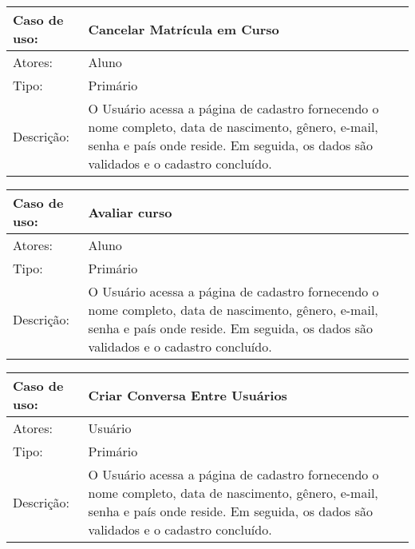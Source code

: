 \documentclass[12pt,a4paper,onecolumn,titlepage]{article}
\begin{document}
\begin{table}[h!]
\begin{center}
\begin{tabular}{p{2.5cm} p{9.5cm}}
Caso de uso: & \textbf{Cancelar Matrícula em Curso} \\ \hline
Atores: & Aluno \\ \hline
Tipo: & Primário \\ \hline
Descrição: & O Usuário acessa a página de cadastro fornecendo o nome completo, data de nascimento, gênero, e-mail, senha e país onde reside. Em seguida, os dados são validados e o cadastro concluído.
\end{tabular}
\end{center}
\end{table}

\newpage

\begin{table}[h!]
\begin{center}
\begin{tabular}{p{2.5cm} p{9.5cm}}
Caso de uso: & \textbf{Avaliar curso} \\ \hline
Atores: & Aluno \\ \hline
Tipo: & Primário \\ \hline
Descrição: & O Usuário acessa a página de cadastro fornecendo o nome completo, data de nascimento, gênero, e-mail, senha e país onde reside. Em seguida, os dados são validados e o cadastro concluído.
\end{tabular}
\end{center}
\end{table}

\newpage

\begin{table}[h!]
\begin{center}
\begin{tabular}{p{2.5cm} p{9.5cm}}
Caso de uso: & \textbf{Criar Conversa Entre Usuários} \\ \hline
Atores: & Usuário \\ \hline
Tipo: & Primário \\ \hline
Descrição: & O Usuário acessa a página de cadastro fornecendo o nome completo, data de nascimento, gênero, e-mail, senha e país onde reside. Em seguida, os dados são validados e o cadastro concluído.
\end{tabular}
\end{center}
\end{table}
\end{document}

